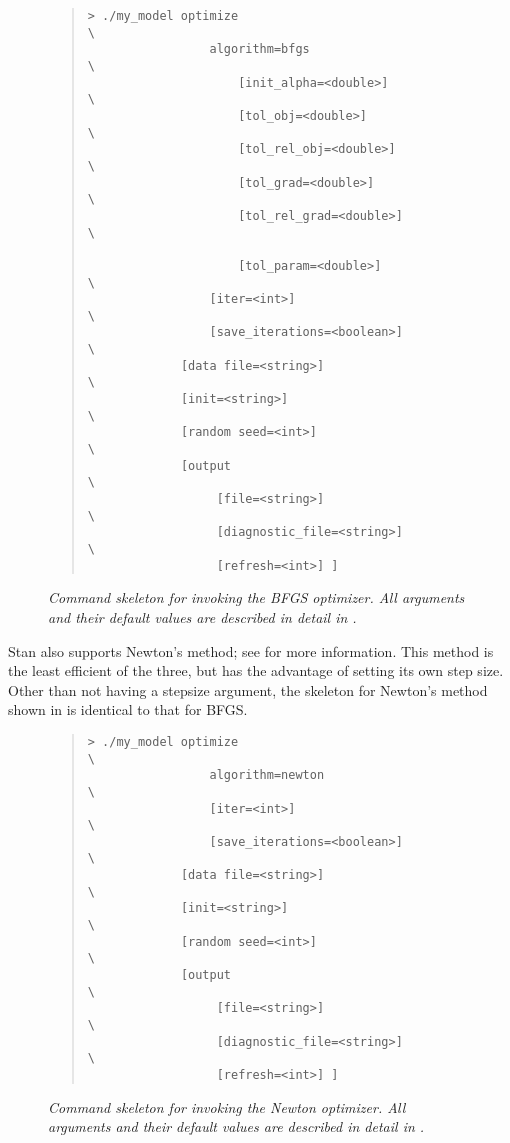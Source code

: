 \begin{figure}
\begin{quote}
\begin{Verbatim}[fontshape=sl,fontsize=\small]
> ./my_model optimize                                   \
                 algorithm=bfgs                         \
                     [init_alpha=<double>]              \
                     [tol_obj=<double>]                 \
                     [tol_rel_obj=<double>]             \
                     [tol_grad=<double>]                \
                     [tol_rel_grad=<double>]            \

                     [tol_param=<double>]               \
                 [iter=<int>]                           \
                 [save_iterations=<boolean>]            \
             [data file=<string>]                       \
             [init=<string>]                            \
             [random seed=<int>]                        \
             [output                                    \
                  [file=<string>]                       \
                  [diagnostic_file=<string>]            \
                  [refresh=<int>] ]
\end{Verbatim}
\end{quote}
\caption{\small\it Command skeleton for invoking the BFGS optimizer.
  All arguments and their default values are described in detail in
  .}
\label{bfgs-command.figure}
\end{figure}
%
Stan also supports Newton's method; see \citep{NocedalWright:2006} for
more information.  This method is the least efficient of the three,
but has the advantage of setting its own step size.  Other than not
having a stepsize argument, the skeleton for Newton's method shown in
\reffigure{newton-command} is identical to that for BFGS.
%
\begin{figure}
\begin{quote}
\begin{Verbatim}[fontshape=sl,fontsize=\small]
> ./my_model optimize                                   \
                 algorithm=newton                       \
                 [iter=<int>]                           \
                 [save_iterations=<boolean>]            \
             [data file=<string>]                       \
             [init=<string>]                            \
             [random seed=<int>]                        \
             [output                                    \
                  [file=<string>]                       \
                  [diagnostic_file=<string>]            \
                  [refresh=<int>] ]
\end{Verbatim}
\end{quote}
\caption{\small\it Command skeleton for invoking the Newton optimizer.
  All arguments and their default values are described in detail in
  .}
\label{newton-command.figure}
\end{figure}
%

